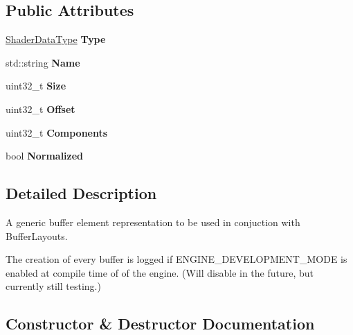 \subsection*{Public Attributes}
\begin{DoxyCompactItemize}
\item 
\mbox{\label{structengine_1_1renderer_1_1BufferElement_ad15963c4b3ba16476cce390f77bcb549}} 
\hyperlink{Buffer_8h_a8d90f87a6e9335927edd305c1e1345c1}{Shader\+Data\+Type} {\bfseries Type}
\item 
\mbox{\label{structengine_1_1renderer_1_1BufferElement_a4d15f927313a59f54d234c435a254fb8}} 
std\+::string {\bfseries Name}
\item 
\mbox{\label{structengine_1_1renderer_1_1BufferElement_aa56181d65756cf32e9c3957bad71c2c1}} 
uint32\+\_\+t {\bfseries Size}
\item 
\mbox{\label{structengine_1_1renderer_1_1BufferElement_acbe3158f166940f1b6a0c9f1add6e028}} 
uint32\+\_\+t {\bfseries Offset}
\item 
\mbox{\label{structengine_1_1renderer_1_1BufferElement_aa67fb27da8ee0faae62a142614a537ff}} 
uint32\+\_\+t {\bfseries Components}
\item 
\mbox{\label{structengine_1_1renderer_1_1BufferElement_ae6515d1eab82fff649da068b2ae863c0}} 
bool {\bfseries Normalized}
\end{DoxyCompactItemize}


\subsection{Detailed Description}
A generic buffer element representation to be used in conjuction with Buffer\+Layouts. 

The creation of every buffer is logged if E\+N\+G\+I\+N\+E\+\_\+\+D\+E\+V\+E\+L\+O\+P\+M\+E\+N\+T\+\_\+\+M\+O\+DE is enabled at compile time of of the engine. (Will disable in the future, but currently still testing.) 

\subsection{Constructor \& Destructor Documentation}
\mbox{\label{structengine_1_1renderer_1_1BufferElement_a76049a787d70b0adf984e65a9994bc1d}} 
